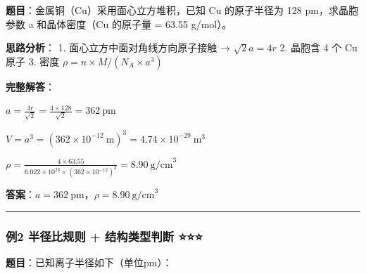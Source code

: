 \documentclass[a4paper,11pt]{ctexart}
\begin{document}
\textbf{题目}：金属铜（Cu）采用面心立方堆积，已知 Cu 的原子半径为 128 pm，求晶胞参数 a 和晶体密度（Cu 的原子量 = 63.55 g/mol）。

\textbf{思路分析}：
1. 面心立方中面对角线方向原子接触 → \(\sqrt{2}a = 4r\)
2. 晶胞含 4 个 Cu 原子
3. 密度 \(\rho = n \times M / (N_A \times a^3)\)

\textbf{完整解答}：

\(a = \frac{4r}{\sqrt{2}} = \frac{4 \times 128}{\sqrt{2}} = 362\ \mathrm{pm}\)

\(V = a^3 = (362 \times 10^{-12}\ \mathrm{m})^3 = 4.74 \times 10^{-29}\ \mathrm{m}^3\)

\(\rho = \frac{4 \times 63.55}{6.022 \times 10^{23} \times (362 \times 10^{-12})^3} = 8.90\ \mathrm{g/cm}^3\)

\textbf{答案}：\(a = 362\ \mathrm{pm}\)，\(\rho = 8.90\ \mathrm{g/cm}^3\)

\begin{center}\rule{0.5\linewidth}{0.5pt}\end{center}

\subsubsection{例2 半径比规则 + 结构类型判断 ⭐⭐⭐}\label{ux4f8b2-ux534aux5f84ux6bd4ux89c4ux5219-ux7ed3ux6784ux7c7bux578bux5224ux65ad}

\textbf{题目}：已知离子半径如下（单位pm）：
\end{document}
